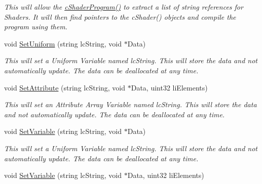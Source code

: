 \begin{DoxyCompactItemize}
\begin{DoxyCompactList}\small\item\em This will allow the \hyperlink{classc_shader_program_ab032906ae85885362543784fea60cc87}{cShaderProgram()} to extract a list of string references for Shaders. It will then find pointers to the cShader() objects and compile the program using them. \end{DoxyCompactList}\item 
\hypertarget{classc_shader_program_af32e0719b95d317afd621a800f7cfc47}{
void \hyperlink{classc_shader_program_af32e0719b95d317afd621a800f7cfc47}{SetUniform} (string lcString, void $\ast$Data)}
\label{classc_shader_program_af32e0719b95d317afd621a800f7cfc47}

\begin{DoxyCompactList}\small\item\em This will set a Uniform Variable named lcString. This will store the data and not automatically update. The data can be deallocated at any time. \end{DoxyCompactList}\item 
\hypertarget{classc_shader_program_a0792c520e3eb96219e4cbea9747dceef}{
void \hyperlink{classc_shader_program_a0792c520e3eb96219e4cbea9747dceef}{SetAttribute} (string lcString, void $\ast$Data, uint32 liElements)}
\label{classc_shader_program_a0792c520e3eb96219e4cbea9747dceef}

\begin{DoxyCompactList}\small\item\em This will set an Attribute Array Variable named lcString. This will store the data and not automatically update. The data can be deallocated at any time. \end{DoxyCompactList}\item 
\hypertarget{classc_shader_program_a82767fc2f7e1b06cccde88e0203cee4f}{
void \hyperlink{classc_shader_program_a82767fc2f7e1b06cccde88e0203cee4f}{SetVariable} (string lcString, void $\ast$Data)}
\label{classc_shader_program_a82767fc2f7e1b06cccde88e0203cee4f}

\begin{DoxyCompactList}\small\item\em This will set a Uniform Variable named lcString. This will store the data and not automatically update. The data can be deallocated at any time. \end{DoxyCompactList}\item 
\hypertarget{classc_shader_program_aa39fb33d84ff062b70c20f4a8696df5d}{
void \hyperlink{classc_shader_program_aa39fb33d84ff062b70c20f4a8696df5d}{SetVariable} (string lcString, void $\ast$Data, uint32 liElements)}
\label{classc_shader_program_aa39fb33d84ff062b70c20f4a8696df5d}


\end{DoxyCompactItemize}
